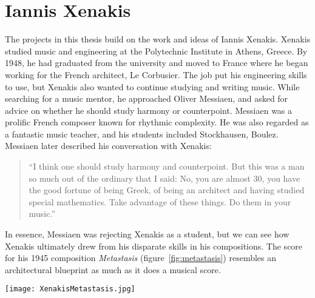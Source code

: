 
\section{Iannis Xenakis}
\label{sec:iannis-xenakis}
The projects in this thesis build on the work and ideas of Iannis
Xenakis. Xenakis studied music and engineering at the Polytechnic
Institute in Athens, Greece. By 1948, he had graduated from the
university and moved to France where he began working for the French
architect, Le Corbusier. The job put his engineering skills to use,
but Xenakis also wanted to continue studying and writing music. While
searching for a music mentor, he approached Oliver Messiaen, and asked
for advice on whether he should study harmony or
counterpoint. Messiaen was a prolific French composer known for
rhythmic complexity. He was also regarded as a fantastic music
teacher, and his students included Stockhausen, Boulez.  Messiaen
later described his conversation with Xenakis:
\begin{quotation}``I think one should study harmony and
  counterpoint. But this was a man so much out of the ordinary that I
  said: No, you are almost 30, you have the good fortune of being
  Greek, of being an architect and having studied special
  mathematics. Take advantage of these things. Do them in your
  music.''\cite{Service2013}
\end{quotation}
In essence, Messiaen was rejecting Xenakis as a student, but we can
see how Xenakis ultimately drew from his disparate skills in his
compositions. The score for his 1945 composition \textit{Metastasis}
(figure~\ref{fig:metastasis}) resembles an architectural blueprint as
much as it does a musical score.

\begin{figure*}[h]
  \texttt{[image: XenakisMetastasis.jpg]}
  \caption{Excerpt from Iannis Xenakis' composition,
    \textit{Metastasis} (1954), measures 309-314. This score in this
    image was then transcribed to sheet music for the orchestral
    performance.}
  \label{fig:metastasis}
\end{figure*}

